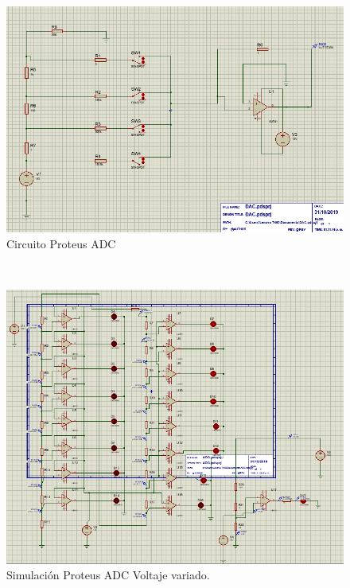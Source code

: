 \documentclass[14pt,letterpaper]{article}
\begin{document}
\begin{figure}[h!]
\begin{center}
\includegraphics[scale=0.5]{Simulacion-PCB/dac.png} 
\caption{Circuito Proteus ADC}
\end{center}
\end{figure}
\
\begin{figure}[h!]
\begin{center}
\includegraphics[scale=0.5]{Simulacion-PCB/simadc.png} 
\caption{Simulación Proteus ADC Voltaje variado.}
\end{center}
\end{figure}
\end{document}

